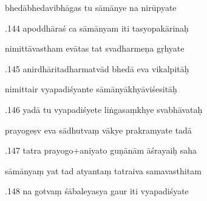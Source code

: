 \documentclass[article,12pt,a4paper]{memoir}%
\newcounter{parCount}
\begin{document}
	  
	  \pstart \leavevmode%
	bhedābhedavibhāgas tu sāmānye na nirūpyate 
	{}
	\pend%
      

	  
	  \pstart {}.144 apoddhāraś ca sāmānyam iti tasyopakārinaḥ 
	{}
	\pend%
      

	  
	  \pstart \leavevmode%
	nimittāvastham evātas tat svadharmeṇa gṛhyate 
	{}
	\pend%
      

	  
	  \pstart {}.145 anirdhāritadharmatvād bhedā eva vikalpitāḥ 
	{}
	\pend%
      

	  
	  \pstart \leavevmode%
	nimittair vyapadiśyante sāmānyākhyāviśesitāḥ 
	{}
	\pend%
      

	  
	  \pstart {}.146 yadā tu vyapadiśyete liṅgasaṃkhye svabhāvataḥ 
	{}
	\pend%
      

	  
	  \pstart \leavevmode%
	prayogeṣv eva sādhutvaṃ vākye prakramyate tadā 
	{}
	\pend%
      

	  
	  \pstart {}.147 tatra prayogo+aniyato guṇānām āśrayaiḥ saha 
	{}
	\pend%
      

	  
	  \pstart \leavevmode%
	sāmānyaṃ yat tad atyantaṃ tatraiva samavasthitam 
	{}
	\pend%
      

	  
	  \pstart {}.148 na gotvaṃ śābaleyasya gaur iti vyapadiśyate 
	{}
	\pend%
      
\end{document}
